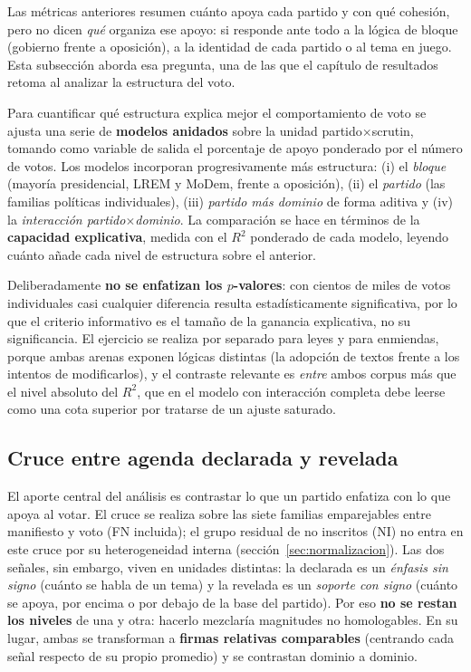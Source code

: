 Las métricas anteriores resumen cuánto apoya cada partido y con qué cohesión, pero
no dicen \emph{qué} organiza ese apoyo: si responde ante todo a la lógica de bloque
(gobierno frente a oposición), a la identidad de cada partido o al tema en juego.
Esta subsección aborda esa pregunta, una de las que el capítulo de resultados
retoma al analizar la estructura del voto.

Para cuantificar qué estructura explica mejor el comportamiento de voto se ajusta
una serie de \textbf{modelos anidados} sobre la unidad partido$\times$scrutin,
tomando como variable de salida el porcentaje de apoyo ponderado por el número de
votos. Los modelos incorporan progresivamente más estructura: (i) el
\emph{bloque} (mayoría presidencial, LREM y MoDem, frente a oposición),
(ii) el \emph{partido}
(las familias políticas individuales), (iii) \emph{partido más dominio} de forma
aditiva y (iv) la \emph{interacción partido$\times$dominio}. La comparación se
hace en términos de la \textbf{capacidad explicativa}, medida con el $R^2$
ponderado de cada modelo, leyendo cuánto añade cada nivel de estructura sobre el
anterior.

Deliberadamente \textbf{no se enfatizan los $p$-valores}: con cientos de miles de
votos individuales casi cualquier diferencia resulta estadísticamente
significativa, por lo que el criterio informativo es el tamaño de la ganancia
explicativa, no su significancia. El ejercicio se realiza por separado para leyes
y para enmiendas, porque ambas arenas exponen lógicas distintas (la adopción de
textos frente a los intentos de modificarlos), y el contraste relevante es
\emph{entre} ambos corpus más que el nivel absoluto del $R^2$, que en el modelo
con interacción completa debe leerse como una cota superior por tratarse de un
ajuste saturado.

\subsection{Cruce entre agenda declarada y revelada}
\label{sec:metricas-cruce}

El aporte central del análisis es contrastar lo que un partido enfatiza con lo
que apoya al votar. El cruce se realiza sobre las siete familias emparejables
entre manifiesto y voto (FN incluida); el grupo residual de no inscritos (NI)
no entra en este cruce por su heterogeneidad interna
(sección~\ref{sec:normalizacion}). Las dos señales, sin embargo, viven en
unidades distintas: la declarada es un \emph{énfasis sin signo} (cuánto se habla
de un tema) y la
revelada es un \emph{soporte con signo} (cuánto se apoya, por encima o por debajo
de la base del partido). Por eso \textbf{no se restan los niveles} de una y otra:
hacerlo mezclaría magnitudes no homologables. En su lugar, ambas se transforman a
\textbf{firmas relativas comparables} (centrando cada señal respecto de su
propio promedio) y se contrastan dominio a dominio.

